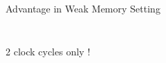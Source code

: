 \documentclass[notes, xcolor=dvipsnames]{beamer}
\begin{document}
    \begin{frame}{Advantage in Weak Memory Setting}

        \begin{columns}
            
            \begin{column}{0.5\textwidth}

                \begin{figure}
                \end{figure}
                                
            \end{column}

            \begin{column}{0.5\textwidth}

                \begin{figure}
                \end{figure}
                        
            \end{column}

        \end{columns} 

        \begin{figure}
        \end{figure}

        2 clock cycles only ! 
        
    \end{frame}
\end{document}
